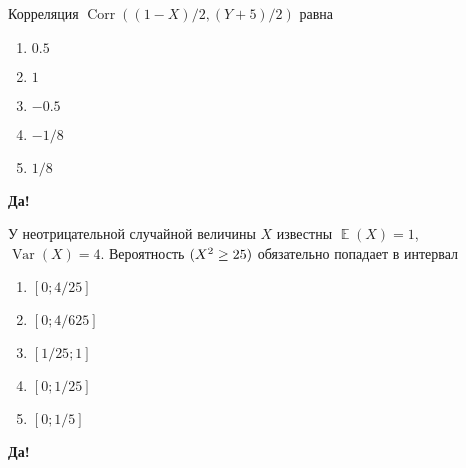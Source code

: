 \documentclass[t]{beamer}
\DeclareMathOperator{\Var}{Var}
\DeclareMathOperator{\Corr}{Corr}
\DeclareMathOperator{\E}{\mathbb{E}}
\let\P\relax
\DeclareMathOperator{\P}{\mathbb{P}}
\begin{document}
 \begin{frame} \label{26-Yes} 
\begin{block}{26} 

Корреляция $\Corr((1-X)/2,(Y+5)/2)$ равна
 


 \end{block} 
\begin{enumerate} 
\item[] \hyperlink{26-Yes}{\beamergotobutton{} $0.5$}
\item[] \hyperlink{26-No}{\beamergotobutton{} $1$
}
\item[] \hyperlink{26-No}{\beamergotobutton{} $-0.5$}
\item[] \hyperlink{26-No}{\beamergotobutton{} $-1/8$}
\item[] \hyperlink{26-No}{\beamergotobutton{} $1/8$}
\end{enumerate} 

 \textbf{Да!} 
 \hyperlink{27}{}\end{frame} 


 \begin{frame} \label{27-Yes} 
\begin{block}{27} 
	
У неотрицательной случайной величины $X$ известны $\E(X)=1$, $\Var(X)=4$. Вероятность $\P(X^2 \geq 25)$ обязательно попадает в интервал
 
 \end{block} 
\begin{enumerate} 
\item[] \hyperlink{27-No}{\beamergotobutton{} $[0;4/25]$}
\item[] \hyperlink{27-No}{\beamergotobutton{} $[0;4/625]$}
\item[] \hyperlink{27-No}{\beamergotobutton{} $[1/25;1]$}
\item[] \hyperlink{27-No}{\beamergotobutton{} $[0;1/25]$}
\item[] \hyperlink{27-Yes}{\beamergotobutton{} $[0;1/5]$}
\end{enumerate} 

 \textbf{Да!} 
 \hyperlink{28}{}\end{frame} 
\end{document}
